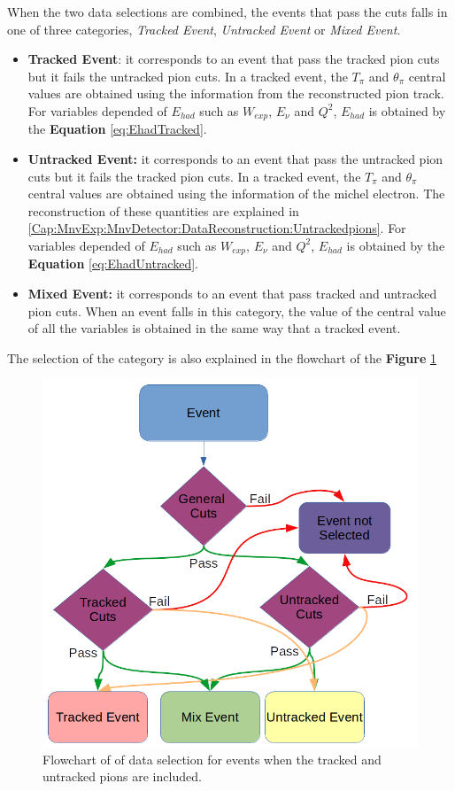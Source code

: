 When the two data selections are combined, the events that pass the cuts falls in one of three categories, \textit{Tracked Event}, \textit{Untracked Event} or \textit{Mixed Event}.
\begin{itemize}
    \item \textbf{Tracked Event}: it corresponds to an event that pass the tracked pion cuts but it fails the untracked pion cuts. In a tracked event, the $T_\pi$ and $\theta_\pi$ central values are obtained using the information from the reconstructed pion track. For variables depended of $E_{had}$ such as $W_{exp}$, $E_\nu$ and $Q^2$, $E_{had}$ is obtained by the \textbf{Equation} \ref{eq:EhadTracked}.
    \item \textbf{Untracked Event:} it corresponds to an event that pass the untracked pion cuts but it fails the tracked pion cuts. In a tracked event, the $T_\pi$ and $\theta_\pi$ central values are obtained using the information of the michel electron. The reconstruction of these quantities are explained in \ref{Cap:MnvExp:MnvDetector:DataReconstruction:Untrackedpions}. For variables depended of $E_{had}$ such as $W_{exp}$, $E_\nu$ and $Q^2$, $E_{had}$ is obtained by the \textbf{Equation} \ref{eq:EhadUntracked}.
    \item  \textbf{Mixed Event:} it corresponds to an event that pass tracked and untracked pion cuts. When an event falls in this category, the value of the central value of all the variables is obtained in the same way that a tracked event. 
\end{itemize}
The selection of the category is also explained in the flowchart of the \textbf{Figure} \ref{fig:Analysis:Cuts:Flowchart} 

\begin{figure}[!htb]
    \centering
    \includegraphics[scale=0.4]{Figures/Chapter4/DataSelection/EventSelFlowchart.png}
    \caption{Flowchart of of data selection for events when the tracked and untracked pions are included.}
    \label{fig:Analysis:Cuts:Flowchart}
\end{figure}

